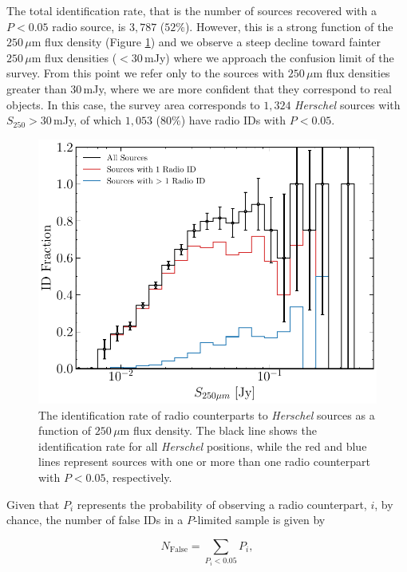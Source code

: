 The total identification rate, that is the number of sources recovered with a $P < 0.05$ radio source, is $3,787$ ($52\%$). However, this is a strong function of the $250\,\mu$m flux density (Figure \ref{fig:id_rate}) and we observe a steep decline toward fainter $250\,\mu$m flux densities ($< 30\,$mJy) where we approach the confusion limit of the survey. From this point we refer only to the sources with $250\,\mu$m flux densities greater than 30\,mJy, where we are more confident that they correspond to real objects. In this case, the survey area corresponds to $1,324$ \textit{Herschel} sources with $S_{250} > 30\,$mJy, of which $1,053$ ($80\%$) have radio IDs with $P < 0.05$.

\begin{figure}
	\centering
	\includegraphics[width=0.8\columnwidth]{Figures/id_fraction_radio.pdf}
	\caption[Identification rate of radio counterparts to \textit{Herschel} sources]{The identification rate of radio counterparts to \textit{Herschel} sources as a function of $250\,\mu$m flux density. The black line shows the identification rate for all \textit{Herschel} positions, while the red and blue lines represent sources with one or more than one radio counterpart with $P < 0.05$, respectively.}
	\label{fig:id_rate}
\end{figure}

Given that $P_i$ represents the probability of observing a radio counterpart, $i$, by chance, the number of false IDs in a $P$-limited sample is given by

\begin{equation}
    N_{\textrm{False}} = \sum_{P_i < 0.05} P_i,
    \label{eq:false_radio_ids}
\end{equation}

